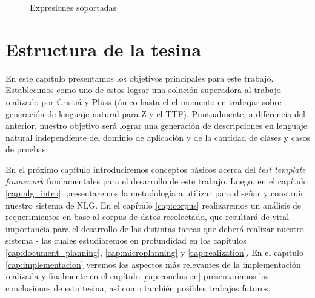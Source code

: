 \begin{figure}[H]
  \caption{Expresiones soportadas}
  \label{fig:alcance}
\end{figure}

\section{Estructura de la tesina}
En este capítulo presentamos los objetivos principales para este trabajo. Establecimos como uno de estos lograr una solución superadora al trabajo realizado por Cristiá y Plüss \cite{cristia_pluss} (único hasta el el momento en trabajar sobre generación de lenguaje natural para Z y el TTF). Puntualmente, a diferencia del anterior, nuestro objetivo será lograr una generación de descripciones en lenguaje natural independiente del dominio de aplicación y de la cantidad de clases y casos de pruebas.

En el próximo capítulo introduciremos conceptos básicos acerca del \textit{test template framework} fundamentales para el desarrollo de este trabajo. Luego, en el capítulo \ref{cap:nlg_intro}, presentaremos la metodología a utilizar para diseñar y construir nuestro sistema de NLG. En el capítulo \ref{cap:corpus} realizaremos un análisis de requerimientos en base al corpus de datos recolectado, que resultará de vital importancia para el desarrollo de las distintas tareas que deberá realizar nuestro sistema - las cuales estudiaremos en profundidad en los capítulos \ref{cap:document_planning}, \ref{cap:microplanning} y \ref{cap:realization}. En el capítulo \ref{cap:implementacion} veremos los aspectos más relevantes de la implementación realizada y finalmente en el capítulo \ref{cap:conclusion} presentaremos las conclusiones de esta tesina, así como también posibles trabajos futuros.